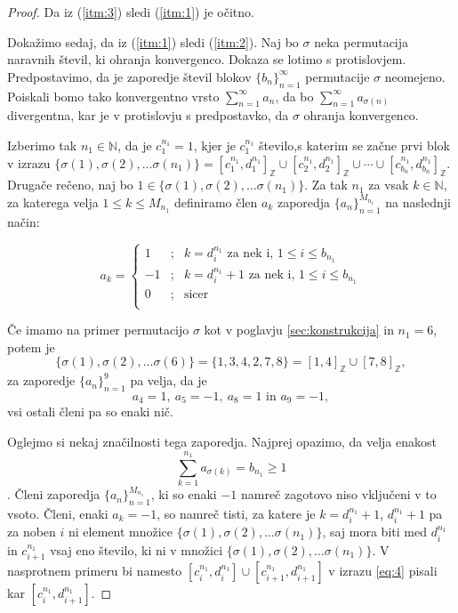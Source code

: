 \documentclass[12pt,a4paper,reqno]{amsart}
\theoremstyle{definition} %
\theoremstyle{plain} %
\newcommand{\N}{\mathbb N}
\newcommand{\Z}{\mathbb Z}
\begin{document}
\begin{proof}
Da iz (\ref{itm:3}) sledi (\ref{itm:1}) je očitno.

Dokažimo sedaj, da iz (\ref{itm:1}) sledi (\ref{itm:2}).
Naj bo $\sigma$ neka permutacija naravnih števil, ki ohranja konvergenco. Dokaza se lotimo s protislovjem. Predpostavimo, da je zaporedje števil blokov $\{b_n\}^{\infty}_{n=1}$ permutacije $\sigma$ neomejeno. Poiskali bomo tako konvergentno vrsto $\sum^{\infty}_{n=1}a_n$, da bo $\sum^{\infty}_{n=1}a_{\sigma (n)}$ divergentna, kar je v protislovju s predpostavko, da $\sigma$ ohranja konvergenco. 

Izberimo tak $n_1\in \N$, da je $c_1^{n_1}=1$, kjer je  $c_1^{n_1}$ število,s katerim se začne prvi blok v izrazu $\{ \sigma (1), \sigma (2), \ldots \sigma (n_1) \} = [c^{n_1}_1, d^{n_1}_1]_{\Z} \cup [c^{n_1}_2, d^{n_1}_2]_{\Z} \cup \cdots \cup [c^{n_1}_{b_n}, d^{n_1}_{b_n}]_{\Z}$. Drugače rečeno, naj bo $1\in \{ \sigma (1), \sigma (2), \ldots \sigma (n_1) \}$. Za tak $n_1$ za vsak $k\in \N$, za katerega velja $1 \leq k \leq M_{n_1}$ definiramo člen $a_k$ zaporedja $\{a_n\}^{M_{n_1}}_{n=1}$ na naslednji način:

$$a_k = 
\left\{ 
\begin{array}{ccc}
1&;&k=d_i^{n_1}\textrm{ za nek i, }1\leq i \leq b_{n_1}\\
-1&;&k=d_i^{n_1}+1\textrm{ za nek i, }1\leq i \leq b_{n_1}\\
0&;&\textrm{sicer}\\
\end{array}
\right. 
$$

Če imamo na primer permutacijo $\sigma$ kot v poglavju \ref{sec:konstrukcija} in $n_1=6$, potem je $$\{ \sigma (1), \sigma (2), \ldots \sigma (6) \} = \{1, 3, 4, 2, 7, 8 \}= [1,4]_{\Z} \cup [7,8]_{\Z},$$ za zaporedje $\{a_n\}^{9}_{n=1}$ pa velja, da je $$a_4=1,\ a_5=-1,\ a_8 =1\textrm{ in }a_9=-1,$$ vsi ostali členi pa so enaki nič.

Oglejmo si nekaj značilnosti tega zaporedja.%
Najprej opazimo, da velja enakost $$\sum_{k=1}^{n_1}a_{\sigma(k)}=b_{n_1}\geq 1$$. Členi zaporedja $\{a_n\}^{M_{n_1}}_{n=1}$, ki so enaki $-1$ namreč zagotovo niso vključeni v to vsoto. Členi, enaki $a_k=-1$, so namreč tisti, za katere je $k=d_i^{n_1}+1$, $d_i^{n_1}+1$ pa za noben $i$ ni element množice $\{ \sigma (1), \sigma (2), \ldots \sigma (n_1) \}$, saj mora biti med $d_i^{n_1}$ in $c_{i+1}^{n_1}$ vsaj eno število, ki ni v množici $\{ \sigma (1), \sigma (2), \ldots \sigma (n_1) \}$. V nasprotnem primeru bi namesto $[c_i^{n_1},d_i^{n_1}] \cup [c_{i+1}^{n_1},d_{i+1}^{n_1}]$ v izrazu \ref{eq:4} pisali kar $[c_i^{n_1},d_{i+1}^{n_1}]$. 


\end{proof}
\end{document}
